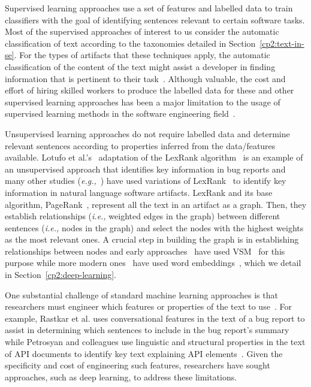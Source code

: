 Supervised learning approaches use a set of features and labelled data
 to train classifiers with the goal of identifying sentences relevant to 
 certain software tasks.
Most of the supervised approaches of interest to us  
consider the automatic classification of text according to the taxonomies 
detailed in Section~\ref{cp2:text-in-se}.
For the types of artifacts that these techniques apply, 
the automatic classification of the 
 content of the text 
might assist a developer 
in finding information that is pertinent to their task~\cite{fucci2019, Arya2019}.
Although valuable, the cost and effort of hiring skilled workers to produce 
the labelled data for these and other supervised learning approaches
has been a major limitation 
to the usage of supervised learning 
methods in the software engineering field~\cite{Arpteg2018, ferreira2021}.



Unsupervised learning approaches do not require labelled data and determine 
relevant sentences according to properties inferred from the data/features available. 
Lotufo et al.'s~\cite{Lotufo2012} adaptation of the LexRank algorithm~\cite{Erkan2004} is an example of 
an unsupervised approach that identifies key information in bug reports
and many other studies (\textit{e.g.,}~\cite{Jiang2017, Ponzanelli2015,  Ponzanelli2017}) have used 
variations of LexRank~\cite{Erkan2004} to identify key information in natural
language software artifacts.
LexRank and its base algorithm, PageRank~\cite{Page1999}, represent all the text in an artifact as a graph.
Then, they establish relationships (\textit{i.e.,} weighted edges in the graph) 
between different sentences (\textit{i.e.,} nodes in the graph) 
and select the nodes with the highest weights as the most relevant ones.
A crucial step in building the graph is in  
establishing  relationships between nodes
and early approaches~\cite{Lotufo2012, Jiang2017} 
have used \ac{VSM}~\cite{Salton1975vsm} 
for this purpose while more modern ones~\cite{Huang2018, silva2019}
have used word embeddings~\cite{Mikolov2013, bojanowski2017FastText},
which we detail in Section~\ref{cp2:deep-learning}.




One substantial challenge of standard machine learning
approaches is that researchers must engineer which 
features or properties of the text to use~\cite{ferreira2021}.
For example, Rastkar et al. uses conversational features in 
the text of a bug report to assist in determining which sentences 
to include in the bug report's summary~\cite{Rastkar2010}
while Petrosyan and colleagues use 
linguistic and structural properties 
in the text of API documents to identify key text 
explaining API elements~\cite{Petrosyan2015}.
Given the specificity and cost of engineering such features, 
researchers have sought approaches, such as deep learning, to address these 
limitations. 






